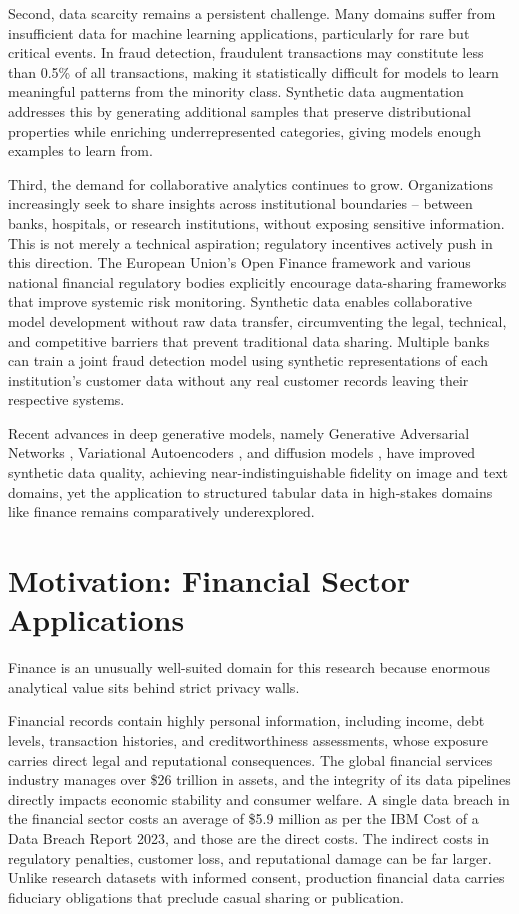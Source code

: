 Second, data scarcity remains a persistent challenge. Many domains suffer from insufficient data for machine learning applications, particularly for rare but critical events. In fraud detection, fraudulent transactions may constitute less than 0.5\% of all transactions, making it statistically difficult for models to learn meaningful patterns from the minority class. Synthetic data augmentation addresses this by generating additional samples that preserve distributional properties while enriching underrepresented categories, giving models enough examples to learn from.

Third, the demand for collaborative analytics continues to grow. Organizations increasingly seek to share insights across institutional boundaries -- between banks, hospitals, or research institutions, without exposing sensitive information. This is not merely a technical aspiration; regulatory incentives actively push in this direction. The European Union's Open Finance framework and various national financial regulatory bodies explicitly encourage data-sharing frameworks that improve systemic risk monitoring. Synthetic data enables collaborative model development without raw data transfer, circumventing the legal, technical, and competitive barriers that prevent traditional data sharing. Multiple banks can train a joint fraud detection model using synthetic representations of each institution's customer data without any real customer records leaving their respective systems.

Recent advances in deep generative models, namely Generative Adversarial Networks \cite{goodfellow2014gan}, Variational Autoencoders \cite{kingma2014vae}, and diffusion models \cite{ho2020ddpm}, have improved synthetic data quality, achieving near-indistinguishable fidelity on image and text domains, yet the application to structured tabular data in high-stakes domains like finance remains comparatively underexplored.

\section{Motivation: Financial Sector Applications}

Finance is an unusually well-suited domain for this research because enormous analytical value sits behind strict privacy walls.

Financial records contain highly personal information, including income, debt levels, transaction histories, and creditworthiness assessments, whose exposure carries direct legal and reputational consequences. The global financial services industry manages over \$26 trillion in assets, and the integrity of its data pipelines directly impacts economic stability and consumer welfare. A single data breach in the financial sector costs an average of \$5.9 million as per the IBM Cost of a Data Breach Report 2023, and those are the direct costs. The indirect costs in regulatory penalties, customer loss, and reputational damage can be far larger. Unlike research datasets with informed consent, production financial data carries fiduciary obligations that preclude casual sharing or publication.

